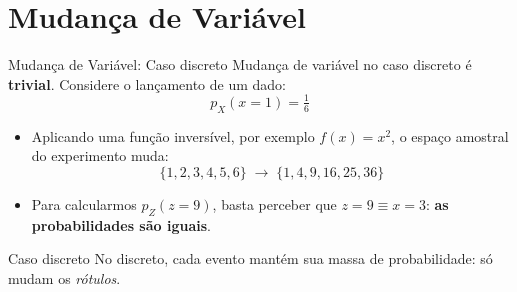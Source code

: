 \documentclass[aspectratio=169,xcolor=dvipsnames]{beamer}
\begin{document}
  \section{Mudança de Variável}

  \begin{frame}{Mudança de Variável: Caso discreto}
    Mudança de variável no caso discreto é \textbf{trivial}. Considere o
    lançamento de um dado:
    \vspace{0.2em}
    \[
      p_{X}(x=1) = \tfrac{1}{6}
    \]
    \vspace{0.2em}
    \begin{itemize}
      \item Aplicando uma função inversível, por exemplo $f(x) = x^{2}$,
      o espaço amostral do experimento muda:
      \[
        \{1, 2, 3, 4, 5, 6\} \;\longrightarrow\; \{1, 4, 9, 16, 25, 36\}
      \]
      \item Para calcularmos $p_{Z}(z = 9)$, basta perceber que
      $z = 9 \equiv x = 3$: \textbf{as probabilidades são iguais}.
    \end{itemize}
    \begin{block}{Caso discreto}
      No discreto, cada evento mantém sua massa de probabilidade: só
      mudam os \emph{rótulos}.
    \end{block}
  \end{frame}
\end{document}
